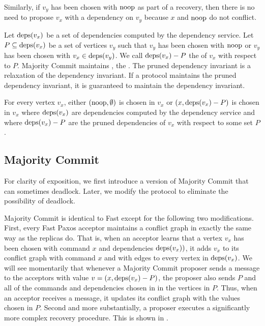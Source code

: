Similarly, if $v_y$ has been chosen with $\text{noop}$ as part of a recovery, then
there is no need to propose $v_x$ with a dependency on $v_y$ because $x$ and
$\text{noop}$ do not conflict.

Let $\text{deps}(v_x)$ be a set of dependencies computed by the dependency service.
Let $P \subseteq \text{deps}(v_x)$ be a set of vertices $v_y$ such that $v_y$ has
been chosen with $\text{noop}$ or $v_y$ has been chosen with $v_x \in \text{deps}(v_y)$. We
call $\text{deps}(v_x) - P$ the  of $v_x$ with respect
to $P$. Majority Commit \BPaxos{} maintains , the
. The pruned dependency invariant is a
relaxation of the dependency invariant. If a protocol maintains the pruned
dependency invariant, it is guaranteed to maintain the dependency invariant.

\begin{invariant}
  For every vertex $v_x$, either $(\text{noop}, \emptyset{})$ is chosen in $v_x$ or
  $(x, \text{deps}(v_x) - P)$ is chosen in $v_x$ where $\text{deps}(v_x)$ are dependencies
  computed by the dependency service and where $\text{deps}(v_x) - P$ are the pruned
  dependencies of $v_x$ with respect to some set $P$.
\end{invariant}

\subsection{Majority Commit \BPaxos{}}
For clarity of exposition, we first introduce a version of Majority Commit
\BPaxos{} that can sometimes deadlock. Later, we modify the protocol to
eliminate the possibility of deadlock.

Majority Commit \BPaxos{} is identical to Fast \BPaxos{} except for the
following two modifications.
%
First, every Fast Paxos acceptor maintains a conflict graph in exactly the same
way as the replicas do. That is, when an acceptor learns that a vertex $v_x$
has been chosen with command $x$ and dependencies $\text{deps}(v_x))$, it adds $v_x$
to its conflict graph with command $x$ and with edges to every vertex in
$\text{deps}(v_x)$. We will see momentarily that whenever a Majority Commit \BPaxos{}
proposer sends a  message to the acceptors with value $v = (x,
\text{deps}(v_x) - P)$, the proposer also sends $P$ and all of the commands and
dependencies chosen in in the vertices in $P$. Thus, when an acceptor receives
a  message, it updates its conflict graph with the values
chosen in $P$.
%
Second and more substantially, a proposer executes a significantly more complex
recovery procedure. This is shown in .

